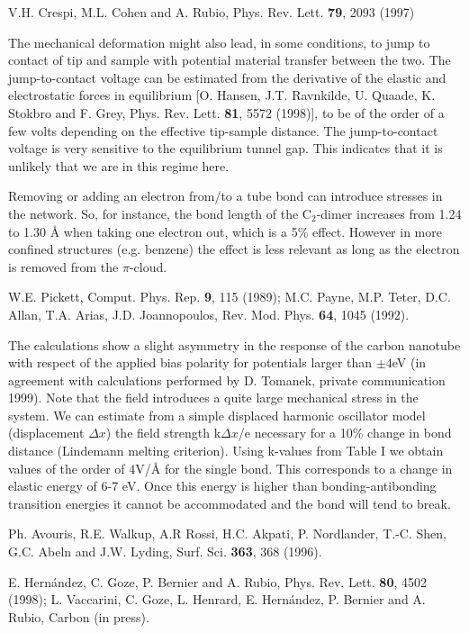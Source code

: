 \begin{multicols}{2}
\begin{thebibliography}{99}
 V.H. Crespi, M.L. Cohen and A. Rubio, Phys. Rev. Lett.
{\bf 79}, 2093 (1997)

 The mechanical deformation might also lead,
in some conditions, to jump to contact of tip and sample with
potential material transfer between the two. The jump-to-contact
voltage can be estimated from the derivative of the elastic and
electrostatic forces in equilibrium [O. Hansen, J.T. Ravnkilde, U.
Quaade, K. Stokbro and F. Grey, Phys. Rev. Lett. {\bf 81}, 5572
(1998)], to be of the order of a few volts depending on the
effective tip-sample distance. The jump-to-contact voltage is very
sensitive to the equilibrium tunnel gap. This indicates that it is
unlikely that we are in this regime here.

 Removing or adding an electron from/to a tube
bond can introduce stresses in the network. So, for instance, the
bond length of the C$_{2}$-dimer increases from 1.24 to 1.30 {\AA}
when taking one electron out, which is a 5\% effect. However in
more confined structures (e.g. benzene) the effect is less
relevant as long as the electron is removed from the $\pi$-cloud.

 W.E. Pickett, Comput. Phys. Rep. {\bf 9}, 115 (1989); 
M.C. Payne, M.P. Teter, D.C. Allan, T.A. Arias, J.D. Joannopoulos, 
Rev. Mod. Phys. {\bf 64}, 1045 (1992).

The calculations show a slight asymmetry in the response of the
carbon nanotube with respect of the applied bias polarity for
potentials larger than $\pm 4$eV (in agreement with calculations
performed by D. Tomanek, private communication 1999). Note that
the field introduces a quite large mechanical stress in the
system. We can estimate from a simple displaced harmonic
oscillator model (displacement $\Delta x$) the field strength
k$\Delta x$/e necessary for a 10\% change in bond distance
(Lindemann melting criterion\cite{Lindemann}). Using k-values from
Table I we obtain values of the order of 4V/{\AA} for the single
bond. This corresponds to a change in elastic energy of 6-7 eV.
Once this energy is higher than bonding-antibonding transition
energies it cannot be accommodated and the bond will tend to
break.

 Ph. Avouris, R.E. Walkup, A.R Rossi, H.C. Akpati, P.
Nordlander, T.-C. Shen, G.C. Abeln and J.W. Lyding, Surf. Sci.
{\bf 363}, 368 (1996).

 E. Hern\'{a}ndez, C. Goze, P. Bernier and A. Rubio,
Phys. Rev. Lett. {\bf 80}, 4502 (1998); L. Vaccarini, C. Goze, L.
Henrard, E. Hern\'{a}ndez, P. Bernier and A. Rubio, Carbon (in press).


\end{thebibliography}
\end{multicols}
